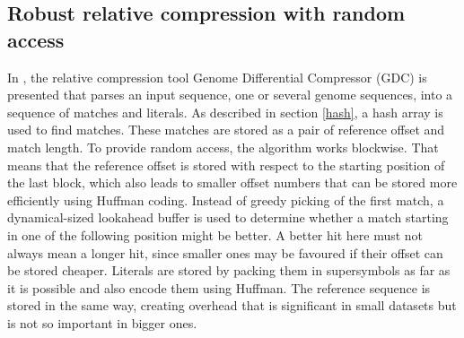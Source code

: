 \documentclass[acmtocl,acmnow]{article}
\begin{document}

\subsection{Robust relative compression with random access}%
\label{GDC}

In \cite{DeoGra}, the relative compression tool Genome Differential Compressor (GDC) is presented that parses an 
input sequence, one or several genome sequences, into a sequence of matches and literals.
As described in section \ref{hash}, a  hash array is used to find matches. These matches are stored as a pair of reference
offset and match length. To provide random access, the algorithm works blockwise. That means that the reference offset is
stored with respect to the starting position of the last block, which also leads to smaller offset numbers that can be
stored more efficiently using Huffman coding.
Instead of greedy picking of the first match, a dynamical-sized lookahead buffer is used to
determine whether a match starting in one of the following position might be better. A better hit here must not always 
mean a longer hit, since smaller ones may be favoured if their offset can be stored cheaper.
Literals are stored by packing them in supersymbols as far as it is possible and also encode them using Huffman. %
The reference sequence is stored in the same way, creating overhead that is significant in small datasets but is not so
important in bigger ones.
\end{document}
